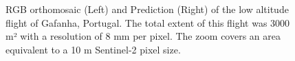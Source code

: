 \documentclass[
  letterpaper,
  11pt,
  english,
  singlespacing,
  headsepline]{MastersDoctoralThesis}
\begin{document}
\begin{spacing}{1.5}
\begin{figure}


\caption{\label{fig-GafLow}RGB orthomosaic (Left) and Prediction (Right)
of the low altitude flight of Gafanha, Portugal. The total extent of
this flight was 3000 m² with a resolution of 8 mm per pixel. The zoom
covers an area equivalent to a 10 m Sentinel-2 pixel size.}


\end{figure}
\end{spacing}
\end{document}
